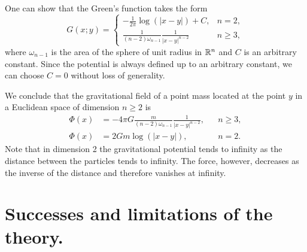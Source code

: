 \begin{points}
\item One can show that the Green's function takes the form
\[
  G(x;y)=\left\{\begin{array}{ll}-\frac{1}{2\pi}\log(|x-y|)+C, & n=2,\\[0.5ex] \frac{1}{(n-2)\omega_{n-1}}\frac{1}{|x-y|^{n-2}} & n\geq3,\end{array}\right.
\]
where $\omega_{n-1}$ is the area of the sphere of unit radius in $\mathbb{R}^n$ and $C$ is an arbitrary constant. Since the potential is always defined up to an arbitrary constant, we can choose $C=0$ without loss of generality.

\item We conclude that the gravitational field of a point mass located at the point $y$ in a Euclidean space of dimension $n\geq2$ is
\begin{align*}
  \Phi(x)&=-4\pi G\frac{m}{(n-2)\omega_{n-1}}\frac{1}{|x-y|^{n-2}}, && n\geq3,\\
  \Phi(x)&=2Gm\log(|x-y|), && n=2.
\end{align*}
Note that in dimension 2 the gravitational potential tends to infinity as the distance between the particles tends to infinity. The force, however, decreases as the inverse of the distance and therefore vanishes at infinity.
\end{points}

\section{Successes and limitations of the theory.}

